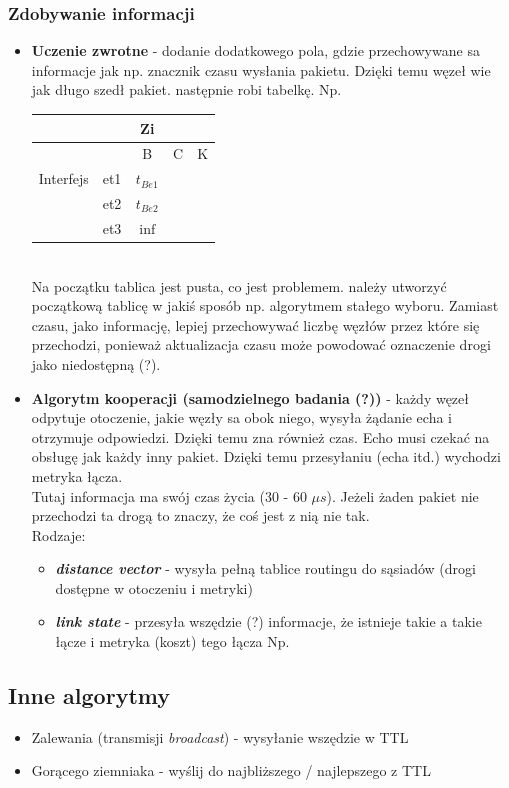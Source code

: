 \documentclass[a4paper,twoside]{article}
\begin{document}
			\subsubsection{Zdobywanie informacji}
				\begin{itemize}
					\item \textbf{Uczenie zwrotne} - dodanie dodatkowego pola, gdzie przechowywane sa informacje jak np. znacznik czasu wysłania pakietu. Dzięki temu węzeł wie jak długo szedł pakiet. następnie robi tabelkę. Np.\\
					\begin{tabular}{|c|c|c|c|c|}
						\hline  &  & Zi &  &  \\
						\hline  &  & B & C & K \\ 
						\hline Interfejs & et1 & $ t_{Be1} $ &  &  \\ 
						\hline  & et2 & $ t_{Be2} $  & & \\ 
						\hline  & et3 & $ \inf $ &  &  \\ 
						\hline 
					\end{tabular}\\
					Na początku tablica jest pusta, co jest problemem. należy utworzyć początkową tablicę w jakiś sposób np. algorytmem stałego wyboru. Zamiast czasu, jako informację, lepiej przechowywać liczbę węzłów przez które się przechodzi, ponieważ aktualizacja czasu może powodować oznaczenie drogi jako niedostępną (?).
					\item \textbf{Algorytm kooperacji (samodzielnego badania (?))} - każdy węzeł odpytuje otoczenie, jakie węzły sa obok niego, wysyła żądanie echa i otrzymuje odpowiedzi. Dzięki temu zna również czas. Echo musi czekać na obsługę jak każdy inny pakiet. Dzięki temu przesyłaniu (echa itd.) wychodzi metryka łącza.\\
					Tutaj informacja ma swój czas życia (30 - 60 $ \mu s $). Jeżeli żaden pakiet nie przechodzi ta drogą to znaczy, że coś jest z nią nie tak.\\
					Rodzaje:
					\begin{itemize}
						\item \textbf{\emph{distance vector}} - wysyła pełną tablice routingu do sąsiadów (drogi dostępne w otoczeniu i metryki)
						\item \textbf{\emph{link state}} - przesyła wszędzie (?) informacje, że istnieje takie a takie łącze i metryka (koszt) tego łącza Np.
					\end{itemize}
				\end{itemize}
		\subsection{Inne algorytmy}
			\begin{itemize}
				\item Zalewania (transmisji \emph{broadcast}) - wysyłanie wszędzie w TTL
				\item Gorącego ziemniaka - wyślij do najbliższego / najlepszego z TTL
			\end{itemize}
\end{document}
